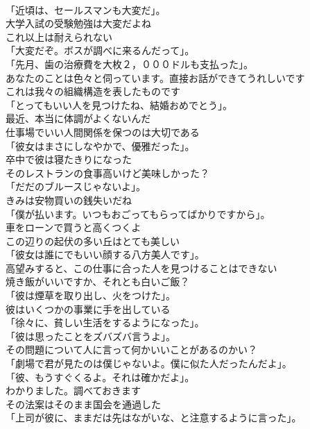 \documentclass[8pt]{extreport}
\begin{document}
\begin{CJK}{UTF8}{min}
\\	「近頃は、セールスマンも大変だ」。	
\\	大学入試の受験勉強は大変だよね	
\\	これ以上は耐えられない	
\\	「大変だぞ。ボスが調べに来るんだって」。	
\\	「先月、歯の治療費を大枚２，０００ドルも支払った」。	
\\	あなたのことは色々と伺っています。直接お話ができてうれしいです	
\\	これは我々の組織構造を表したものです	
\\	「とってもいい人を見つけたね、結婚おめでとう」。	
\\	最近、本当に体調がよくないんだ	
\\	仕事場でいい人間関係を保つのは大切である	
\\	「彼女はまさにしなやかで、優雅だった」。	
\\	卒中で彼は寝たきりになった	
\\	そのレストランの食事高いけど美味しかった？	
\\	「だだのブルースじゃないよ」。	
\\	きみは安物買いの銭失いだね	
\\	「僕が払います。いつもおごってもらってばかりですから」。	
\\	車をローンで買うと高くつくよ	
\\	この辺りの起伏の多い丘はとても美しい	
\\	「彼女は誰にでもいい顔する八方美人です」。	
\\	高望みすると、この仕事に合った人を見つけることはできない	
\\	焼き飯がいいですか、それとも白いご飯？	
\\	「彼は煙草を取り出し、火をつけた」。	
\\	彼はいくつかの事業に手を出している	
\\	「徐々に、貧しい生活をするようになった」。	
\\	「彼は思ったことをズバズバ言うよ」。	
\\	その問題について人に言って何かいいことがあるのかい？	
\\	「劇場で君が見たのは僕じゃないよ。僕に似た人だったんだよ」。	
\\	「彼、もうすぐくるよ。それは確かだよ」。	
\\	わかりました。調べておきます	
\\	その法案はそのまま国会を通過した	
\\	「上司が彼に、ままだは先はながいな、と注意するように言った」。	

\end{CJK}
\end{document}
